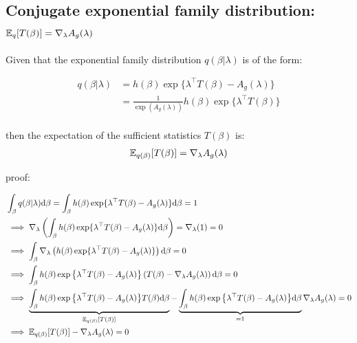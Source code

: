 \documentclass{article}
\def\DLambda{\nabla_{\lambda}}
\begin{document}

\subsection{Conjugate exponential family distribution: $\E_q [ T(\beta) ] = \DLambda A_g(\lambda)$ \optional}


\begin{lemma}

	Given that the exponential family distribution $q(\beta | \lambda)$ is of the form:
	
	\begin{equation}\begin{split}
		q (\beta | \lambda) &= h (\beta) \exp \{ \lambda^\top T(\beta) - A_g (\lambda)\}\\ 
		&= \frac{1}{\exp(A_g (\lambda))} h (\beta) \exp \{ \lambda^\top T(\beta) \}\\
	\end{split}\end{equation}
		
 then the expectation of the sufficient statistics $T(\beta)$ is:		
		\begin{equation}\begin{split}
		\E_{q(\beta)} [ T(\beta) ] = \DLambda A_g(\lambda)
		\end{split}\end{equation}
			
\end{lemma}

proof:

\begin{equation}\begin{split}
&\int_{\beta} q (\beta | \lambda) \d \beta =  \int_{\beta}  h (\beta) \exp \{ \lambda^\top T(\beta) - A_g (\lambda) \} \d \beta = 1\\
&\implies  \DLambda \left( \int_{\beta}  h (\beta) \exp \{ \lambda^\top T(\beta) - A_g (\lambda) \} \d \beta \right) = \DLambda (1) = 0\\
&\implies \int_{\beta}    \DLambda \left( h (\beta) \exp \{ \lambda^\top T(\beta) - A_g (\lambda) \} \right) \d \beta  = 0\\
&\implies \int_{\beta}   h (\beta) \exp \big\{ \lambda^\top T(\beta) - A_g (\lambda) \big\}  \left(   T(\beta) -  \DLambda A_g (\lambda) \right) \d \beta  = 0\\
&\implies \underbrace{\int_{\beta}  h (\beta) \exp \big\{ \lambda^\top T(\beta) - A_g (\lambda) \big\} T(\beta) \d \beta }_{\E_{q(\beta)}[ T(\beta)]}  -
\underbrace{\int_{\beta}  h (\beta) \exp \big\{ \lambda^\top T(\beta) - A_g (\lambda) \big\} \d \beta}_{=1}  \DLambda A_g (\lambda)  = 0\\
&\implies  \E_{q(\beta)}[ T(\beta)]  - \DLambda A_g(\lambda)  = 0
\end{split}\end{equation}
\end{document}
